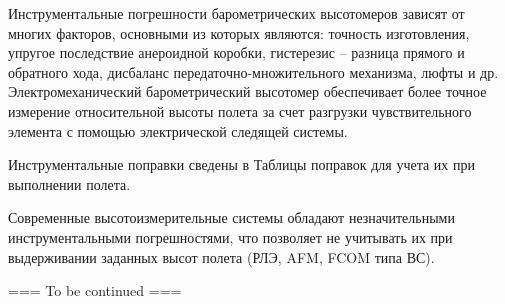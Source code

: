 Инструментальные погрешности барометрических высотомеров зависят от многих факторов, основными из которых являются: точность изготовления, упругое последствие анероидной коробки, гистерезис – разница прямого и обратного хода, дисбаланс передаточно-множительного механизма, люфты и др.
Электромеханический барометрический высотомер обеспечивает более точное измерение относительной высоты полета за счет разгрузки чувствительного элемента с помощью электрической следящей системы. 

Инструментальные поправки сведены в Таблицы поправок для учета их при выполнении полета.

Современные высотоизмерительные системы обладают незначительными инструментальными погрешностями, что позволяет не учитывать их при выдерживании заданных высот полета (РЛЭ, AFM, FCOM типа ВС).

\begin{center}
    === To be continued ===
\end{center}
